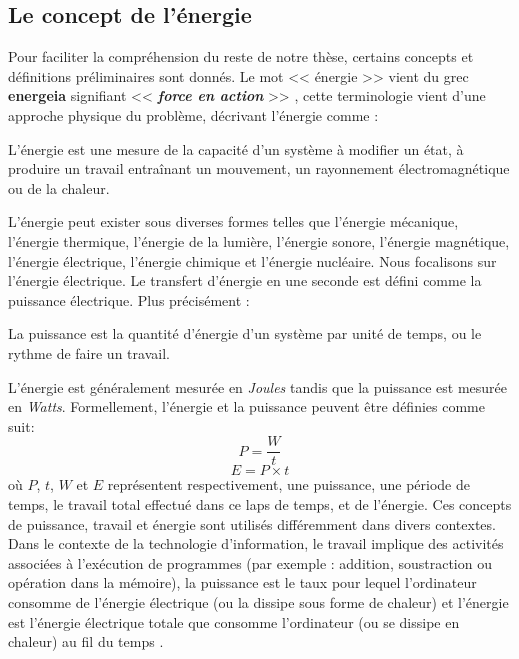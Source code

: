 \subsection{Le concept de l'énergie}
Pour faciliter la compréhension du reste de notre thèse, certains concepts et définitions préliminaires sont donnés. Le mot << énergie >> vient du grec \textbf{energeia} signifiant << \textit{\textbf{force en action}} >> \cite{Bowers00}, cette terminologie vient d'une approche physique du problème, décrivant l'énergie comme \cite{Ronneau04}:
\begin{definition}
L'énergie est une mesure de la capacité d'un système à modifier un état, à produire un travail entraînant un mouvement, un rayonnement électromagnétique ou de la chaleur.
\end{definition}
L'énergie peut exister sous diverses formes telles que l'énergie mécanique, l'énergie thermique, l'énergie de la lumière, l'énergie sonore, l'énergie magnétique, l'énergie électrique, l'énergie chimique et l'énergie nucléaire. Nous focalisons sur l'énergie électrique.
Le transfert d’énergie en une seconde est défini comme la puissance électrique. Plus précisément :
\begin{definition}
La puissance est la quantité d'énergie d'un système par unité de temps, ou le rythme de faire un travail.
\end{definition}
L'énergie est généralement mesurée en \textit{Joules} tandis que la puissance est mesurée en \textit{Watts}. Formellement, l'énergie et la puissance peuvent être définies comme suit:
\begin{equation}\label{eq:power}
 P = \frac{W}{t}
\end{equation}
\begin{equation}\label{eq:energy}
 E = P \times t
\end{equation}
où $P$, $t$, $W$ et $E$ représentent respectivement, une puissance, une période de temps, le travail total effectué dans ce laps de temps, et de l'énergie. Ces concepts de puissance, travail et énergie sont utilisés différemment dans divers contextes. Dans le contexte de la technologie d'information, le travail implique des activités associées à l'exécution de programmes (par exemple : addition, soustraction ou opération dans la mémoire), la puissance est le taux pour lequel l'ordinateur consomme de l'énergie électrique (ou la dissipe sous forme de chaleur) et l'énergie est l'énergie électrique totale que consomme l'ordinateur (ou se dissipe en chaleur) au fil du temps \cite{Venkatachalam05}.

